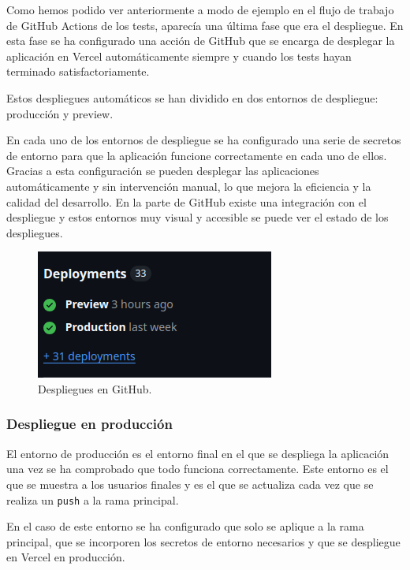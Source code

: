 Como hemos podido ver anteriormente a modo de ejemplo en el flujo de trabajo de GitHub Actions de los tests, aparecía una última fase que era el despliegue. En esta fase se ha configurado una acción de GitHub que se encarga de desplegar la aplicación en Vercel automáticamente siempre y cuando los tests hayan terminado satisfactoriamente.

Estos despliegues automáticos se han dividido en dos entornos de despliegue: producción y preview.

En cada uno de los entornos de despliegue se ha configurado una serie de secretos de entorno para que la aplicación funcione correctamente en cada uno de ellos. Gracias a esta configuración se pueden desplegar las aplicaciones automáticamente y sin intervención manual, lo que mejora la eficiencia y la calidad del desarrollo. En la parte de GitHub existe una integración con el despliegue y estos entornos muy visual y accesible se puede ver el estado de los despliegues.

\begin{figure}[H]
    \caption{Despliegues en GitHub.}
    \centering
    \vspace*{0.5cm}
    \includegraphics[scale=0.5]{figuras/despliegues.png}
\end{figure}

\subsubsection{Despliegue en producción}

El entorno de producción es el entorno final en el que se despliega la aplicación una vez se ha comprobado que todo funciona correctamente. Este entorno es el que se muestra a los usuarios finales y es el que se actualiza cada vez que se realiza un \texttt{push} a la rama principal.

En el caso de este entorno se ha configurado que solo se aplique a la rama principal, que se incorporen los secretos de entorno necesarios y que se despliegue en Vercel en producción.

